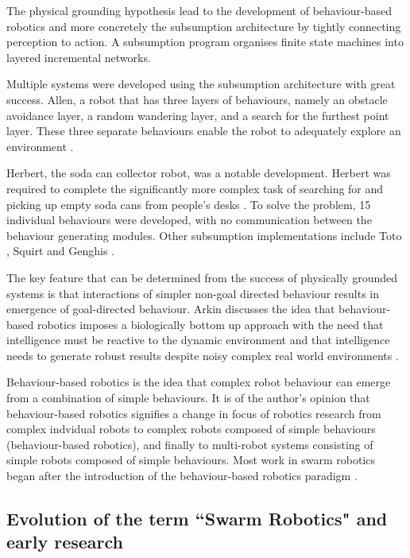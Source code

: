 The physical grounding hypothesis lead to the development of behaviour-based robotics and more concretely the subsumption architecture \cite{brooks1986robust} by tightly connecting perception to action. A subsumption program organises finite state machines into layered incremental networks. 

Multiple systems were developed using the subsumption architecture with great success. Allen, a robot that has three layers of behaviours, namely an obstacle avoidance layer, a random wandering layer, and a search for the furthest point layer. These three separate behaviours enable the robot to adequately explore an environment \cite{brooks1986robust}.

Herbert, the soda can collector robot, was a notable development. Herbert was required to complete the significantly more complex task of searching for and picking up empty soda cans from people's desks \cite{connell1989colony}. To solve the problem, 15 individual behaviours were developed, with no communication between the behaviour generating modules. Other subsumption implementations include Toto \cite{mataric1990distributed}, Squirt \cite{flynn1989world} and Genghis \cite{brooks1989robot}.

The key feature that can be determined from the success of physically grounded systems is that interactions of simpler non-goal directed behaviour results in emergence of goal-directed behaviour. Arkin discusses the idea that behaviour-based robotics imposes a biologically bottom up approach with the need that intelligence must be reactive to the dynamic environment and that intelligence needs to generate robust results despite noisy complex real world environments \cite{arkin1990integrating}.

Behaviour-based robotics is the idea that complex robot behaviour can emerge from a combination of simple behaviours. It is of the author's opinion that behaviour-based robotics signifies a change in focus of robotics research from complex indvidual robots to complex robots composed of simple behaviours (behaviour-based robotics), and finally to multi-robot systems consisting of simple robots composed of simple behaviours. Most work in swarm robotics began after the introduction of the behaviour-based robotics paradigm \cite{arai2002editorial}.

\subsection{Evolution of the term ``Swarm Robotics" and early research}
\label{early-research}


